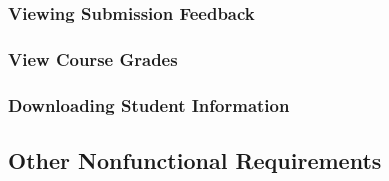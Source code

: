 \documentclass{article}
\begin{document}
\subsubsection{Viewing Submission Feedback}

\subsubsection{View Course Grades}



\subsubsection{Downloading Student Information}

\subsection{Other Nonfunctional Requirements}






\end{document}
